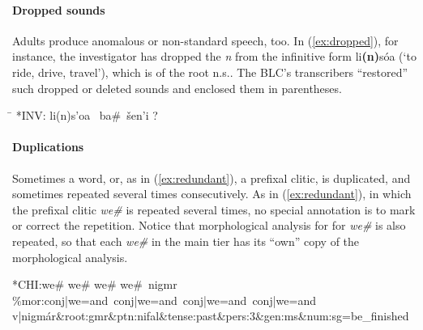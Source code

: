 \paragraph{Dropped sounds}
Adults produce anomalous or non-standard speech, too. In (\ref{ex:dropped}), for instance, the investigator 
has dropped the 
\emph{n} from the infinitive form 
\textsf{li\textbf{(n)}s\'oa} (`to ride, drive, travel'), 
which is of the root n.s.. 
The \ac{BLC}'s transcribers ``restored'' such dropped or deleted sounds and enclosed them in parentheses.
\begin{exe} \label{ex:dropped}
\ex \begin{tabbing}
\hspace{0.6in} \= \hspace{5.5in} \kill
\textsf{*INV:} \> \textsf{li(n)s\a'{o}a \, ba\#\, \v{s}en\a'{i} ?}
\end{tabbing}
\end{exe}

\paragraph{Duplications}
Sometimes a word, or, as in (\ref{ex:redundant}), a prefixal clitic, is duplicated, and sometimes repeated
several times consecutively. As in (\ref{ex:redundant}), in which the prefixal clitic \textit{we\#} is 
repeated several times, no special annotation is to mark or correct the repetition. Notice that morphological analysis for
for \textit{we\#} is also repeated, so that each \textit{we\#} in the main tier has its ``own'' copy of the morphological analysis.
\begin{exe} \label{ex:redundant}
\ex \textsf{*\ac{CH}I:\quad we\# we\# we\# we\#\, nigmr } \\
   \textsf{\%mor:\quad conj|we=and\, conj|we=and\, conj|we=and\, conj|we=and} \\
   \textsf{v|nigm\'ar\&root:gmr\&ptn:nifal\&tense:past\&pers:3\&gen:ms\&num:sg=be\_finished }
\end{exe}

 
